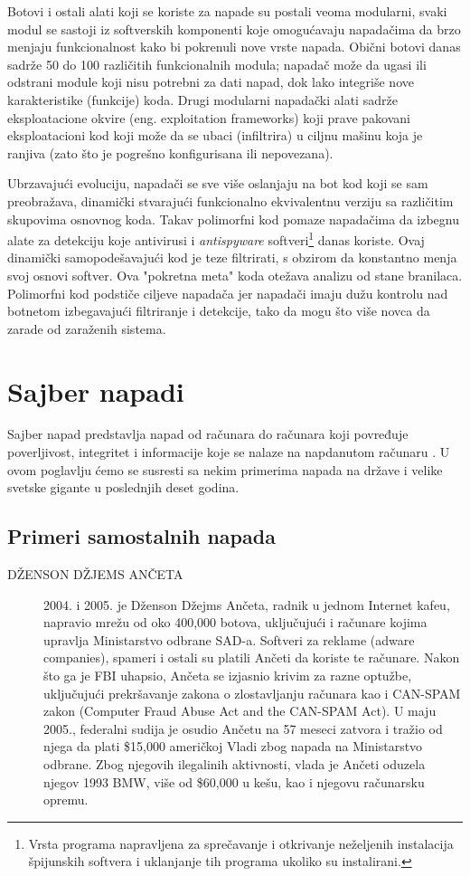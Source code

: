 \documentclass[a4paper]{article}
\begin{document}
{Botovi i ostali alati koji se koriste za napade su postali veoma modularni, svaki modul se sastoji iz softverskih komponenti koje omogućavaju napadačima da brzo menjaju funkcionalnost kako bi pokrenuli nove vrste napada. Obični botovi danas sadrže 50 do 100 različitih funkcionalnih modula; napadač može da ugasi ili odstrani module koji nisu potrebni za dati napad, dok lako integriše nove karakteristike (funkcije) koda. Drugi modularni napadački alati sadrže eksploatacione okvire (eng. exploitation  frameworks) koji prave pakovani eksploatacioni kod koji može da se ubaci (infiltrira) u ciljnu mašinu koja je ranjiva (zato što je pogrešno konfigurisana ili nepovezana).

Ubrzavajući evoluciju, napadači se sve više oslanjaju na bot kod koji se sam preobražava, dinamički stvarajući funkcionalno ekvivalentnu verziju sa različitim skupovima osnovnog koda. Takav polimorfni kod pomaze napadačima da izbegnu alate za detekciju koje antivirusi i \textit{antispyware} softveri\footnote{Vrsta programa napravljena za sprečavanje i otkrivanje neželjenih instalacija špijunskih softvera i uklanjanje tih programa ukoliko su instalirani.} danas koriste. Ovaj dinamički samopodešavajući kod je teze filtrirati, s obzirom da konstantno menja svoj osnovi softver. Ova "pokretna meta" koda otežava analizu od stane branilaca. Polimorfni kod podstiče ciljeve napadača jer napadači imaju dužu kontrolu nad botnetom izbegavajući filtriranje i detekcije, tako da mogu što više novca da zarade od zaraženih sistema.

\section{Sajber napadi}
\label{sec:sajber_napadi}

Sajber napad predstavlja napad od računara do računara koji povređuje poverljivost, integritet i informacije koje se nalaze na napdanutom računaru \cite{knjiga}. U ovom poglavlju ćemo se susresti sa nekim primerima napada na države i velike svetske gigante u poslednjih deset godina. 

\subsection{Primeri samostalnih napada}
\label{subsec:primeri_samo_napada}

\begin{description}
\item[DŽENSON DŽJEMS ANČETA] 2004. i 2005. je Dženson Džejms Ančeta, radnik u jednom Internet kafeu, napravio mrežu od oko 400,000 botova, uključujući i računare kojima upravlja Ministarstvo odbrane SAD-a. Softveri za reklame (adware companies), spameri i ostali su platili Ančeti da koriste te računare. Nakon što ga je FBI uhapsio, Ančeta se izjasnio krivim za razne optužbe, uključujući prekršavanje zakona o zlostavljanju računara kao i CAN-SPAM zakon (Computer Fraud Abuse Act and the CAN-SPAM Act). U maju 2005., federalni sudija je osudio Ančetu na 57 meseci zatvora i tražio od njega da plati \$15,000 američkoj Vladi zbog napada na Ministarstvo odbrane. Zbog njegovih ilegalinih aktivnosti, vlada je Ančeti oduzela njegov 1993 BMW, više od \$60,000 u kešu, kao i njegovu računarsku opremu.


\end{description}}
\end{document}

